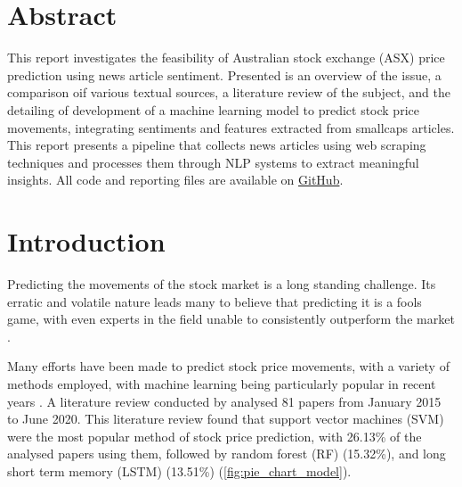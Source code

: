 \section{Abstract}

This report investigates the feasibility of Australian stock exchange (ASX) price prediction using news article sentiment. Presented is an overview of the issue, a comparison oif various textual sources, a literature review of the subject, and the detailing of development of a machine learning model to predict stock price movements, integrating sentiments and features extracted from smallcaps articles. This report presents a pipeline that collects news articles using web scraping techniques and processes them through NLP systems to extract meaningful insights. All code and reporting files are available on \href{https://github.com/H-unter/MA3831-Assignment-2-3}{GitHub}. 

\section{Introduction}


Predicting the movements of the stock market is a long standing challenge. Its erratic and volatile nature leads many to believe that predicting it is a fools game, with even experts in the field unable to consistently outperform the market \cite{efh_article,swedroe_spiva,gunnars2024beatmarket}. 

Many efforts have been made to predict stock price movements, with a variety of methods employed, with machine learning being particularly popular in recent years \cite{al_literature_review}. A literature review conducted by \cite{al_literature_review} analysed 81 papers  from January 2015 to June 2020. This literature review found that support vector machines (SVM) were the most popular method of stock price prediction, with 26.13\% of the analysed papers using them, followed by random forest (RF) (15.32\%), and long short term memory (LSTM) (13.51\%) (\cref{fig:pie_chart_model}). 


